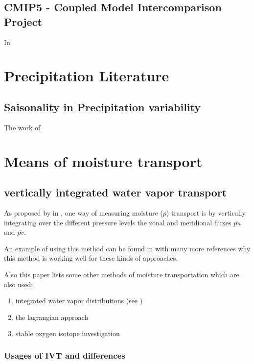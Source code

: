 \subsection{CMIP5 - Coupled Model Intercomparison Project}

In \cite{taylor2012overview_cmip5}


\section{Precipitation Literature}

\subsection{Saisonality in Precipitation variability}


The work of \citeauthor{precipitation_seasonality}

\section{Means of moisture transport}

\subsection{vertically integrated water vapor transport}

As proposed by \citeauthor{AProposedAlgorithmforMoistureFluxesfromAtmosphericRivers} in \cite{AProposedAlgorithmforMoistureFluxesfromAtmosphericRivers}, one way of measuring moisture ($p$) transport is by vertically integrating over the different pressure levels the zonal and meridional fluxes $\overline{pu}$ and $\overline{pv}$. 

An example of using this method can be found in \cite{Ayantobo2021IntegratedMT} with many more references why this method is working well for these kinds of approaches. 

Also this paper lists some other methods of moisture transportation which are also used:

\begin{enumerate}
  \item integrated water vapor distributions (see \cite{gimeno2014atmospheric_rivers_review})
  \item the lagrangian approach
  \item stable oxygen isotope investigation
\end{enumerate}

\subsubsection{Usages of IVT and differences}

